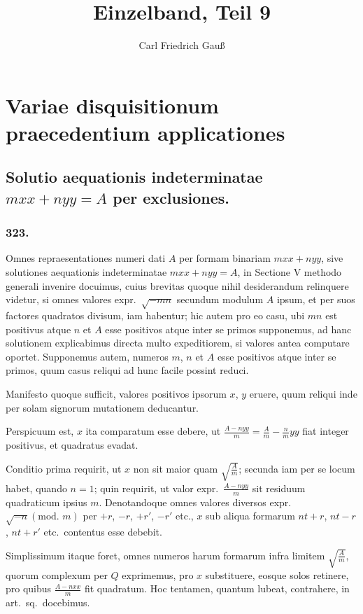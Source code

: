 \documentclass[12pt,a4paper]{article}
\title{Einzelband, Teil 9}
\author{Carl Friedrich Gau\ss}
\date{}
\theoremstyle{plain}
\theoremstyle{definition}
\theoremstyle{remark}
\begin{document}
\maketitle

\section*{Variae disquisitionum praecedentium applicationes}

\subsection*{Solutio aequationis indeterminatae $mxx+nyy=A$ per exclusiones.}

\subsubsection*{323.}

Omnes repraesentationes numeri dati $A$ per formam binariam $mxx+nyy$,
sive solutiones aequationis indeterminatae $mxx+nyy=A$, in Sectione V
methodo generali invenire docuimus, cuius brevitas quoque nihil desiderandum
relinquere videtur, si omnes valores expr.\ $\sqrt{-mn}$ secundum modulum $A$
ipsum, et per suos factores quadratos divisum, iam habentur; hic autem pro
eo casu, ubi $mn$ est positivus atque $n$ et $A$ esse positivos atque inter se
primos supponemus, ad hanc solutionem explicabimus directa multo
expeditiorem, si valores antea computare oportet. Supponemus autem,
numeros $m$, $n$ et $A$ esse positivos atque inter se primos, quum casus reliqui
ad hunc facile possint reduci.

Manifesto quoque sufficit, valores positivos ipsorum $x$, $y$ eruere, quum
reliqui inde per solam signorum mutationem deducantur.

Perspicuum est, $x$ ita comparatum esse debere, ut
$\frac{A-nyy}{m}=\frac{A}{m}-\frac{n}{m}yy$ fiat integer positivus, et quadratus evadat.

Conditio prima requirit, ut $x$ non sit maior quam
$\sqrt{\frac{A}{m}}$; secunda iam per se locum habet, quando $n=1$; quin requirit, ut
valor expr.\ $\frac{A-nyy}{m}$ sit residuum quadraticum ipsius $m$. Denotandoque
omnes valores diversos expr.\ $\sqrt{-n}(\text{mod.\ }m)$ per
$+r$, $-r$, $+r'$, $-r'$ etc., $x$ sub aliqua formarum
$nt+r$, $nt-r$, $nt+r'$ etc.\ contentus esse debebit.

Simplissimum itaque foret, omnes numeros harum formarum infra limitem
$\sqrt{\frac{A}{m}}$, quorum complexum per $Q$ exprimemus, pro $x$ substituere, eosque
solos retinere, pro quibus $\frac{A-nxx}{m}$ fit quadratum. Hoc tentamen, quantum
lubeat, contrahere, in art.\ sq.\ docebimus.
\end{document}
